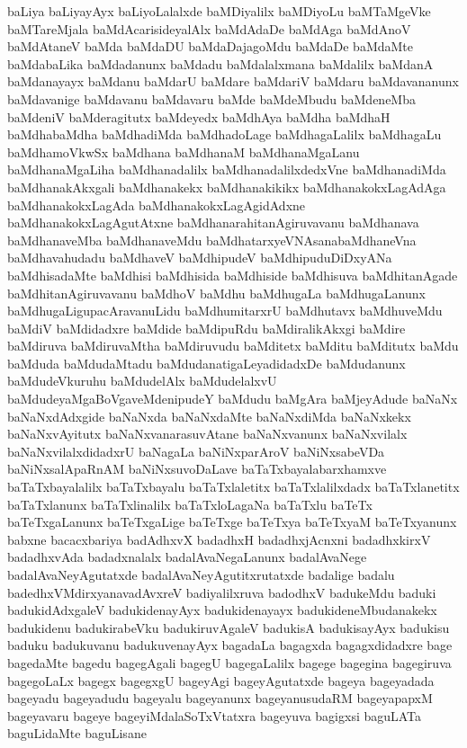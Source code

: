 {baLiya
baLiyayAyx
baLiyoLalalxde
baMDiyalilx
baMDiyoLu
baMTaMgeVke
baMTareMjala
baMdAcarisideyalAlx
baMdAdaDe
baMdAga
baMdAnoV
baMdAtaneV
baMda
baMdaDU
baMdaDajagoMdu
baMdaDe
baMdaMte
baMdabaLika
baMdadanunx
baMdadu
baMdalalxmana
baMdalilx
baMdanA
baMdanayayx
baMdanu
baMdarU
baMdare
baMdariV
baMdaru
baMdavananunx
baMdavanige
baMdavanu
baMdavaru
baMde
baMdeMbudu
baMdeneMba
baMdeniV
baMderagitutx
baMdeyedx
baMdhAya
baMdha
baMdhaH
baMdhabaMdha
baMdhadiMda
baMdhadoLage
baMdhagaLalilx
baMdhagaLu
baMdhamoVkwSx
baMdhana
baMdhanaM
baMdhanaMgaLanu
baMdhanaMgaLiha
baMdhanadalilx
baMdhanadalilxdedxVne
baMdhanadiMda
baMdhanakAkxgali
baMdhanakekx
baMdhanakikikx
baMdhanakokxLagAdAga
baMdhanakokxLagAda
baMdhanakokxLagAgidAdxne
baMdhanakokxLagAgutAtxne
baMdhanarahitanAgiruvavanu
baMdhanava
baMdhanaveMba
baMdhanaveMdu
baMdhatarxyeVNAsanabaMdhaneVna
baMdhavahudadu
baMdhaveV
baMdhipudeV
baMdhipuduDiDxyANa
baMdhisadaMte
baMdhisi
baMdhisida
baMdhiside
baMdhisuva
baMdhitanAgade
baMdhitanAgiruvavanu
baMdhoV
baMdhu
baMdhugaLa
baMdhugaLanunx
baMdhugaLigupacAravanuLidu
baMdhumitarxrU
baMdhutavx
baMdhuveMdu
baMdiV
baMdidadxre
baMdide
baMdipuRdu
baMdiralikAkxgi
baMdire
baMdiruva
baMdiruvaMtha
baMdiruvudu
baMditetx
baMditu
baMditutx
baMdu
baMduda
baMdudaMtadu
baMdudanatigaLeyadidadxDe
baMdudanunx
baMdudeVkuruhu
baMdudelAlx
baMdudelalxvU
baMdudeyaMgaBoVgaveMdenipudeY
baMdudu
baMgAra
baMjeyAdude
baNaNx
baNaNxdAdxgide
baNaNxda
baNaNxdaMte
baNaNxdiMda
baNaNxkekx
baNaNxvAyitutx
baNaNxvanarasuvAtane
baNaNxvanunx
baNaNxvilalx
baNaNxvilalxdidadxrU
baNagaLa
baNiNxparAroV
baNiNxsabeVDa
baNiNxsalApaRnAM
baNiNxsuvoDaLave
baTaTxbayalabarxhamxve
baTaTxbayalalilx
baTaTxbayalu
baTaTxlaletitx
baTaTxlalilxdadx
baTaTxlanetitx
baTaTxlanunx
baTaTxlinalilx
baTaTxloLagaNa
baTaTxlu
baTeTx
baTeTxgaLanunx
baTeTxgaLige
baTeTxge
baTeTxya
baTeTxyaM
baTeTxyanunx
babxne
bacacxbariya
badAdhxvX
badadhxH
badadhxjAcnxni
badadhxkirxV
badadhxvAda
badadxnalalx
badalAvaNegaLanunx
badalAvaNege
badalAvaNeyAgutatxde
badalAvaNeyAgutitxrutatxde
badalige
badalu
badedhxVMdirxyanavadAvxreV
badiyalilxruva
badodhxV
badukeMdu
baduki
badukidAdxgaleV
badukidenayAyx
badukidenayayx
badukideneMbudanakekx
badukidenu
badukirabeVku
badukiruvAgaleV
badukisA
badukisayAyx
badukisu
baduku
badukuvanu
badukuvenayAyx
bagadaLa
bagagxda
bagagxdidadxre
bage
bagedaMte
bagedu
bagegAgali
bagegU
bagegaLalilx
bagege
bagegina
bagegiruva
bagegoLaLx
bagegx
bagegxgU
bageyAgi
bageyAgutatxde
bageya
bageyadada
bageyadu
bageyadudu
bageyalu
bageyanunx
bageyanusudaRM
bageyapapxM
bageyavaru
bageye
bageyiMdalaSoTxVtatxra
bageyuva
bagigxsi
baguLATa
baguLidaMte
baguLisane
}
